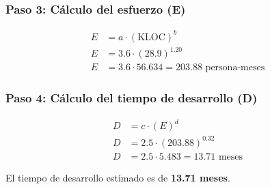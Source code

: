 \subsubsection{Paso 3: Cálculo del esfuerzo (E)}
\begin{align}
    E &= a \cdot (\text{KLOC})^b\\
    E &= 3.6 \cdot (28.9)^{1.20}\\
    E &= 3.6 \cdot 56.634 = \boxed{203.88 \text{ persona-meses}}
\end{align}

\subsubsection{Paso 4: Cálculo del tiempo de desarrollo (D)}
\begin{align}
    D &= c \cdot (E)^d\\
    D &= 2.5 \cdot (203.88)^{0.32}\\
    D &= 2.5 \cdot 5.483 = \boxed{13.71 \text{ meses}}
\end{align}

\begin{solucion}
    El tiempo de desarrollo estimado es de \textbf{13.71 meses}.
\end{solucion}
